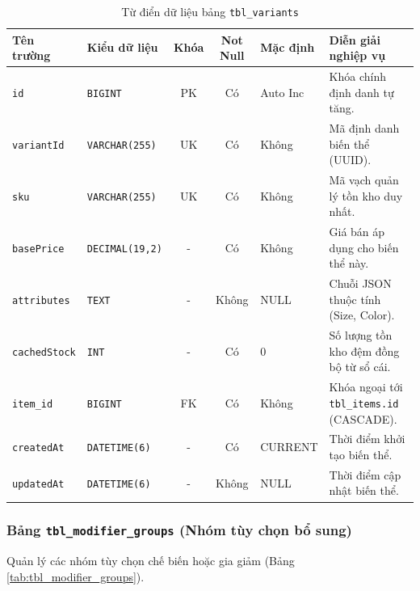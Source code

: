 \begin{table}[htbp]
\centering
\caption{Từ điển dữ liệu bảng \texttt{tbl\_variants}}
\label{tab:tbl_variants}
\vspace{2mm}
\begin{tabularx}{\textwidth}{|p{2.5cm}|p{2.8cm}|c|c|p{1.8cm}|X|}
\hline
\textbf{Tên trường} & \textbf{Kiểu dữ liệu} & \textbf{Khóa} & \textbf{Not Null} & \textbf{Mặc định} & \textbf{Diễn giải nghiệp vụ} \\ \hline
\texttt{id} & \texttt{BIGINT} & PK & Có & Auto Inc & Khóa chính định danh tự tăng. \\ \hline
\texttt{variantId} & \texttt{VARCHAR(255)} & UK & Có & Không & Mã định danh biến thể (UUID). \\ \hline
\texttt{sku} & \texttt{VARCHAR(255)} & UK & Có & Không & Mã vạch quản lý tồn kho duy nhất. \\ \hline
\texttt{basePrice} & \texttt{DECIMAL(19,2)} & - & Có & Không & Giá bán áp dụng cho biến thể này. \\ \hline
\texttt{attributes} & \texttt{TEXT} & - & Không & NULL & Chuỗi JSON thuộc tính (Size, Color). \\ \hline
\texttt{cachedStock} & \texttt{INT} & - & Có & 0 & Số lượng tồn kho đệm đồng bộ từ sổ cái. \\ \hline
\texttt{item\_id} & \texttt{BIGINT} & FK & Có & Không & Khóa ngoại tới \texttt{tbl\_items.id} (CASCADE). \\ \hline
\texttt{createdAt} & \texttt{DATETIME(6)} & - & Có & CURRENT & Thời điểm khởi tạo biến thể. \\ \hline
\texttt{updatedAt} & \texttt{DATETIME(6)} & - & Không & NULL & Thời điểm cập nhật biến thể. \\ \hline
\end{tabularx}
\end{table}

\subsubsection{Bảng \texttt{tbl\_modifier\_groups} (Nhóm tùy chọn bổ sung)}
Quản lý các nhóm tùy chọn chế biến hoặc gia giảm (Bảng \ref{tab:tbl_modifier_groups}).

